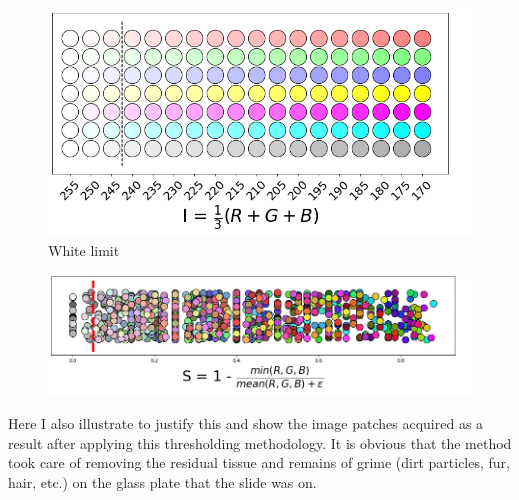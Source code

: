 \documentclass[a4paper,12pt]{article}
\begin{document}
\begin{figure}[H]
    \centering
    \includegraphics[width=.6\textwidth]{intensity.png}
    \caption{White limit}
    \label{fig:intensity}
\end{figure}

\begin{figure}[H]
    \centering
    \includegraphics[width=.7\textwidth]{saturation.png}
    \label{fig:saturation}
\end{figure}

\vspace{4mm}

\par Here I also illustrate to justify this and show the image patches acquired as a result after applying this thresholding methodology. It is obvious that the method took care of removing the residual tissue and remains of grime (dirt particles, fur, hair, etc.) on the glass plate that the slide was on.

\vspace{10mm}
\end{document}

